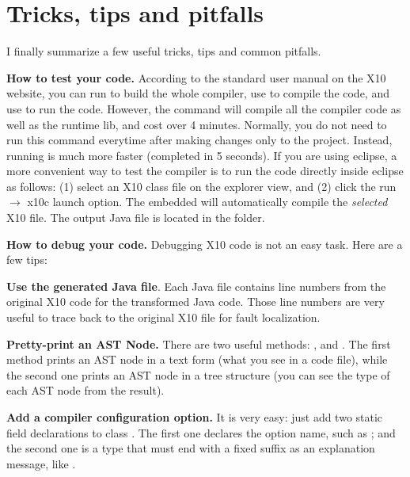 \documentclass{article}
\begin{document}
\section{Tricks, tips and pitfalls}
\label{sec:tips}

I finally summarize a few useful tricks, tips and common pitfalls.

\begin{enumerate}

\Item \textbf{How to test your code.} According to the standard user manual on the  X10 website, you can run  to build the whole compiler,  use  to compile the code, and use  to run the code. However, the command  will compile all the compiler code as well as the runtime lib, and cost over 4 minutes. Normally, you do not need to run this command everytime after making changes only to the  project. Instead, running  is much more faster (completed in 5 seconds). If you are using eclipse, a more convenient way to test the compiler is to run the code directly inside eclipse as follows: (1) select an X10 class file on the explorer view, and (2) click the run $\rightarrow$ x10c launch option. The embedded  will automatically compile the \textit{selected} X10 file. The output Java file is located in the  folder. 

\Item \textbf{How to debug your code.} Debugging X10 code is not an easy task. Here are a few tips:

\begin{itemize}

\Item \textbf{Use the generated Java file}. Each Java file contains  line numbers from the original X10 code for the transformed Java code. Those line numbers are very useful to trace back to the original X10 file for fault localization.

\Item \textbf{Pretty-print an AST Node.} There are two useful methods: , and . The first method prints an AST node in a text form (what you see in a code file), while the second one prints an AST node in a tree structure (you can see the type of each AST node from the result).

\end{itemize}


\Item \textbf{Add a compiler configuration option.} It is very easy: just add two static field declarations to class .  The first one declares the option name, such as ; and the second one is a  type that must end with a fixed suffix  as an explanation message, like   .



\end{enumerate}
\end{document}
